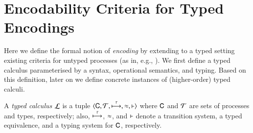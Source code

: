 \documentclass[runningheads]{llncs}
\begin{document}
{%






\section{Encodability Criteria for Typed Encodings}
\label{s:expr}
%
Here we define the formal notion of \emph{encoding} by 
extending to a typed setting existing criteria for untyped processes (as in, e.g.,
\cite{Nestmann00,Palamidessi03,DBLP:conf/lics/PalamidessiSVV06,DBLP:journals/iandc/Gorla10,DBLP:conf/icalp/LanesePSS10,DBLP:journals/tcs/FuL10,DBLP:journals/corr/abs-1208-2750,DBLP:conf/esop/PetersNG13}). 
We first define a typed calculus parameterised by a syntax, operational semantics, and typing.
Based on this definition, later on we define concrete instances of (higher-order) typed calculi.

\smallskip 

\begin{definition}\label{d:tcalculus}%
	A \emph{typed calculus} $\mathcal{L}$ is a tuple
	$\langle \mathsf{C}, \cal{T}, \stackrel{\tau}{\longmapsto}, \approx, \vdash \rangle$
	where $\mathsf{C}$ and $\cal{T}$ are sets of processes and types, 
	respectively; also, $\stackrel{\tau}{\longmapsto}$, $\approx$, and $\vdash$ 
	denote a transition system, a typed equivalence,
	and a typing system for $\mathsf{C}$, respectively. 
\end{definition}

%
%
%
%

}
\end{document}
